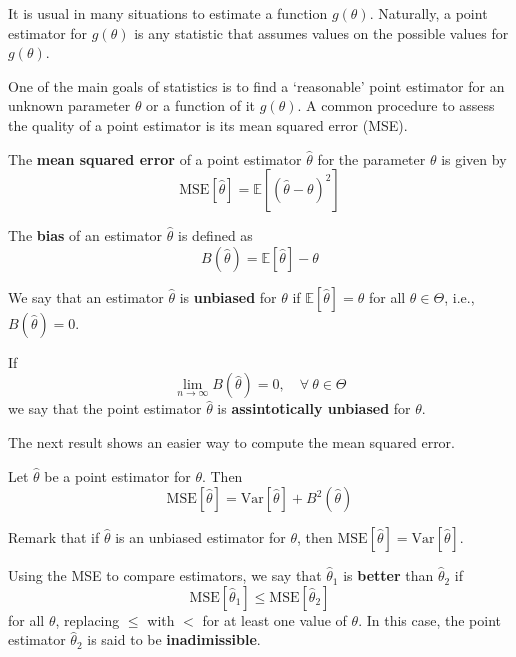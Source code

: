 \documentclass[12pt,a4paper]{report}
\begin{document}
It is usual in many situations to estimate a function $g(\theta)$. Naturally, a point estimator for $g(\theta)$ is any statistic that assumes values on the possible values for $g(\theta)$. 

One of the main goals of statistics is to find a `reasonable' point estimator for an unknown parameter $\theta$ or a function of it $g(\theta)$. A common procedure to assess the quality of a point estimator is its mean squared error (MSE). 

\begin{definition}
    The \textbf{mean squared error} of a point estimator $\hat{\theta}$ for the parameter $\theta$ is given by 
    \[
        \text{MSE}[\hat{\theta}] = \mathbb{E}[(\hat{\theta} - \theta)^2]
    \]
\end{definition}

\begin{definition}[Bias]
    The \textbf{bias} of an estimator $\hat{\theta}$ is defined as
    \[
        B(\hat{\theta}) = \mathbb{E}[\hat{\theta}] - \theta
    \]

    We say that an estimator $\hat{\theta}$ is \textbf{unbiased} for $\theta$ if $\mathbb{E}[\hat{\theta}] = \theta$ for all $\theta \in \Theta$, i.e., $B(\hat{\theta}) = 0$. 

    If
    \[
        \lim_{n \to \infty} B(\hat{\theta}) = 0, \quad \forall ~\theta \in \Theta
    \]
    we say that the point estimator $\hat{\theta}$ is \textbf{assintotically unbiased} for $\theta$. 
\end{definition}

The next result shows an easier way to compute the mean squared error. 

\begin{theorem}
    Let $\hat{\theta}$ be a point estimator for $\theta$. Then
    \[
        \text{MSE}[\hat{\theta}] = \text{Var}[\hat{\theta}] + B^2(\hat{\theta})
    \]
\end{theorem}

Remark that if $\hat{\theta}$ is an unbiased estimator for $\theta$, then $\text{MSE}[\hat{\theta}] = \text{Var}[\hat{\theta}]$. 

Using the MSE to compare estimators, we say that $\hat{\theta}_1$ is \textbf{better} than $\hat{\theta}_2$ if 
\begin{equation*}
    \text{MSE}[\hat{\theta}_1] \leq \text{MSE}[\hat{\theta}_2] 
\end{equation*}
for all $\theta$, replacing $\leq$ with $<$ for at least one value of $\theta$. In this case, the point estimator $\hat{\theta}_2$ is said to be \textbf{inadimissible}. 
\end{document}
